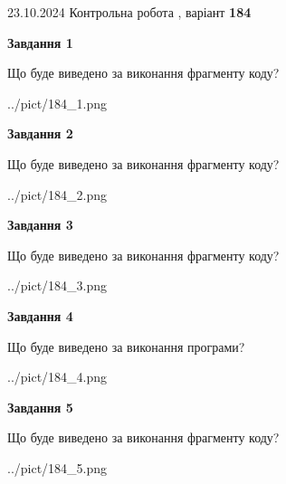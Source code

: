 \documentclass[12pt, ukrainian]{article}
\begin{document}
{\Large{23.10.2024 Контрольна робота , варіант  \No \textbf { 184 }\par}}
{
\begin {large}
{\begin {center}\textbf{Завдання 1}\end {center}}

Що буде виведено за виконання фрагменту коду?\par
\begin{center}
	{../pict/184_1.png}
\end{center}
\newpage

{\begin {center}\textbf{Завдання 2}\end {center}}

Що буде виведено за виконання фрагменту коду?\par
\begin{center}
	{../pict/184_2.png}
\end{center}
\newpage

{\begin {center}\textbf{Завдання 3}\end {center}}

Що буде виведено за виконання фрагменту коду?\par
\begin{center}
	{../pict/184_3.png}
\end{center}
\newpage

{\begin {center}\textbf{Завдання 4}\end {center}}

Що буде виведено за виконання програми?\par
\begin{center}
	{../pict/184_4.png}
\end{center}
\newpage

{\begin {center}\textbf{Завдання 5}\end {center}}

Що буде виведено за виконання фрагменту коду?\par
\begin{center}
	{../pict/184_5.png}
\end{center}
\newpage


\end{large}}
\end{document}
